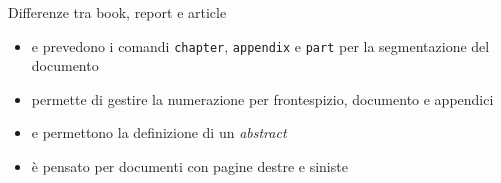 \begin{frame}{Differenze tra book, report e article}

\begin{itemize}
	\item \mbook{} e \mreport{} prevedono i comandi \texttt{chapter}, 
	\texttt{appendix} e \texttt{part} per la segmentazione del documento
	\item \mbook{} permette di gestire la numerazione per frontespizio,
	documento e appendici
	\item \mreport{} e \marticle{} permettono la definizione di un 
	\emph{abstract}
	\item \mbook{} è pensato per documenti con pagine destre e siniste
\end{itemize}

\end{frame}